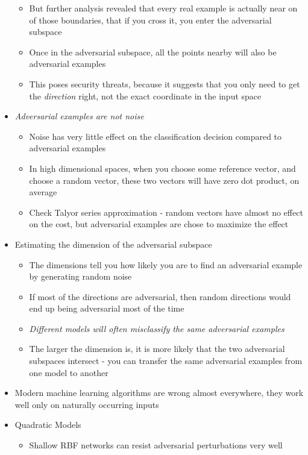 \begin{itemize}
\begin{itemize}
		\item But further analysis revealed that every real example is actually near on of those boundaries, that if you cross it, you enter the adversarial subspace
		\item Once in the adversarial subspace, all the points nearby will also be adversarial examples
		\item This poses security threats, because it suggests that you only need to get the \textit{direction} right, not the exact coordinate in the input space
	\end{itemize}
	\item \textit{Adversarial examples are not noise}
	\begin{itemize}
		\item Noise has very little effect on the classification decision compared to adversarial examples
		\item In high dimensional spaces, when you choose some reference vector, and choose a random vector, these two vectors will have zero dot product, on average
		\item Check Talyor series approximation - random vectors have almost no effect on the cost, but adversarial examples are chose to maximize the effect
	\end{itemize}
 	\item Estimating the dimension of the adversarial subspace
 	\begin{itemize}
 		\item The dimensions tell you how likely you are to find an adversarial example by generating random noise
 		\item If most of the directions are adversarial, then random directions would end up being adversarial most of the time
 		\item \textit{Different models will often misclassify the same adversarial examples}
 		\item The larger the dimension is, it is more likely that the two adversarial subspaces intersect - you can transfer the same adversarial examples from one model to another
 	\end{itemize}
 	\item Modern machine learning algorithms are wrong almost everywhere, they work well only on naturally occurring inputs 
 	\item Quadratic Models
 	\begin{itemize}
 		\item Shallow RBF networks can resist adversarial perturbations very well

\end{itemize}
\end{itemize}
